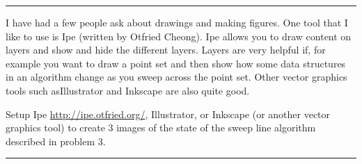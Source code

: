 \documentclass[11pt]{article}
\begin{document}
\hrule









I have had a few people ask about drawings and making figures.  One tool that I
like to use is Ipe (written by Otfried Cheong).  Ipe allows you to draw content
on layers and show and hide the different layers.  Layers are very helpful if,
for example you want to draw a point set and then show how some data structures
in an algorithm change as you sweep across the point set.
Other vector graphics tools such asIllustrator and Inkscape are also quite good.

Setup Ipe \url{http://ipe.otfried.org/}, Illustrator, or Inkscape
(or another vector graphics tool)
to create 3 images of the state of the sweep line algorithm
described in problem 3.

\hrule
\end{document}
